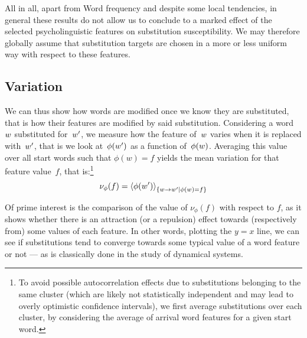 All in all, apart from Word frequency and despite some local tendencies, {in general} these results do not allow us to conclude  to a marked effect %
of the selected psycholinguistic features on substitution susceptibility.
We may therefore globally assume that substitution targets are chosen in a more or less uniform way with respect to these features.


\subsection{Variation}

We can thus show how words are modified once we know they are substituted, that is how their features are modified by said substitution.
Considering a word~$w$ substituted for~$w'$, we measure how the feature of~$w$ varies when it is replaced with~$w'$, that is we look at~$\phi(w')$ as a function of~$\phi(w)$.
Averaging this value over all start words such that $\phi(w) = f$ yields the mean variation for that feature value~$f$, that is:\footnote{To avoid possible autocorrelation effects due to substitutions belonging to the same cluster (which are likely not statistically independent and may lead to overly optimistic confidence intervals), we first average substitutions over each cluster, by considering the average of arrival word features for a given start word.}
$$\nu_{\phi}(f) = \left<\phi(w')\right>_{\left\lbrace w\rightarrow w' | \phi(w) = f \right\rbrace}$$

Of prime interest is the comparison of the value of $\nu_{\phi}(f)$ with respect to $f$, as it shows whether there is an attraction (or a repulsion) effect towards (respectively from) some values of each feature.
In other words, plotting the $y=x$ line, we can see if substitutions tend to converge towards some typical value of a word feature or not --- as is classically done in the study of dynamical systems.

